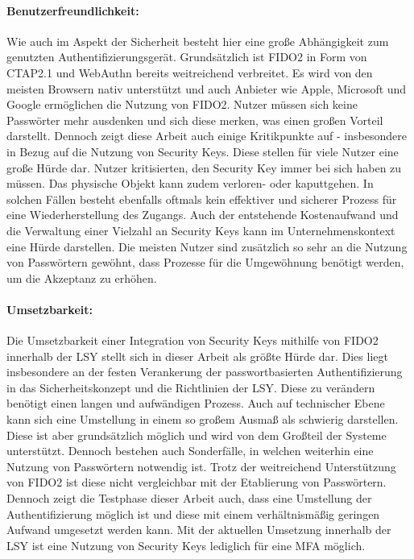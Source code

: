 \paragraph*{Benutzerfreundlichkeit:} Wie auch im Aspekt der Sicherheit besteht hier eine große Abhängigkeit zum genutzten Authentifizierungsgerät. Grundsätzlich ist \ac{FIDO}2 in Form von CTAP2.1 und WebAuthn bereits weitreichend verbreitet. Es wird von den meisten Browsern nativ unterstützt und auch Anbieter wie Apple, Microsoft und Google ermöglichen die Nutzung von \ac{FIDO}2. Nutzer müssen sich keine Passwörter mehr ausdenken und sich diese merken, was einen großen Vorteil darstellt. Dennoch zeigt diese Arbeit auch einige Kritikpunkte auf - insbesondere in Bezug auf die Nutzung von Security Keys. Diese stellen für viele Nutzer eine große Hürde dar. Nutzer kritisierten, den Security Key immer bei sich haben zu müssen. Das physische Objekt kann zudem verloren- oder kaputtgehen. In solchen Fällen besteht ebenfalls oftmals kein effektiver und sicherer Prozess für eine Wiederherstellung des Zugangs. Auch der entstehende Kostenaufwand und die Verwaltung einer Vielzahl an Security Keys kann im Unternehmenskontext eine Hürde darstellen. Die meisten Nutzer sind zusätzlich so sehr an die Nutzung von Passwörtern gewöhnt, dass Prozesse für die Umgewöhnung benötigt werden, um die Akzeptanz zu erhöhen.

\paragraph*{Umsetzbarkeit:} Die Umsetzbarkeit einer Integration von Security Keys mithilfe von \ac{FIDO}2 innerhalb der \ac{LSY} stellt sich in dieser Arbeit als größte Hürde dar. Dies liegt insbesondere an der festen Verankerung der passwortbasierten Authentifizierung in das Sicherheitskonzept und die Richtlinien der \ac{LSY}. Diese zu verändern benötigt einen langen und aufwändigen Prozess. Auch auf technischer Ebene kann sich eine Umstellung in einem so großem Ausmaß als schwierig darstellen. Diese ist aber grundsätzlich möglich und wird von dem Großteil der Systeme unterstützt. Dennoch bestehen auch Sonderfälle, in welchen weiterhin eine Nutzung von Passwörtern notwendig ist. Trotz der weitreichend Unterstützung von \ac{FIDO}2 ist diese nicht vergleichbar mit der Etablierung von Passwörtern. Dennoch zeigt die Testphase dieser Arbeit auch, dass eine Umstellung der Authentifizierung möglich ist und diese mit einem verhältnismäßig geringen Aufwand umgesetzt werden kann. Mit der aktuellen Umsetzung innerhalb der \ac{LSY} ist eine Nutzung von Security Keys lediglich für eine \ac{MFA} möglich. 

